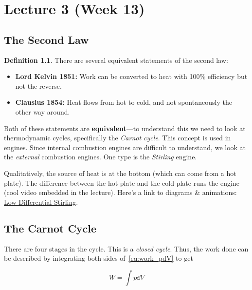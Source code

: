 \documentclass[12pt,chapterprefix=false,dvipsnames]{scrbook}
\theoremstyle{dotless}
\theoremstyle{definition}
\newtheorem{protodefinition}{Definition}[section]
\newenvironment{definition}
{\colorlet{shadecolor}{black!15}\begin{shaded}\begin{protodefinition}}
			{\end{protodefinition}\end{shaded}}
\begin{document}
%

\chapter{Lecture 3 (Week 13)}%
\label{cha:lecture_3}

\section{The Second Law}%
\label{sec:the_second_law}

\begin{definition}
	There are several equivalent statements of the second law:
	\begin{itemize}
		\item \textbf{Lord Kelvin 1851:} Work can be converted to heat with 100\%
		      efficiency but not the reverse.
		\item \textbf{Clausius 1854:} Heat flows from hot to cold, and not
		      spontaneously the other way around.
	\end{itemize}
\end{definition}

Both of these statements are \textbf{equivalent}---to
understand this we need to look at thermodynamic cycles,
specifically the \textit{Carnot cycle}. This concept is used
in engines. Since internal combustion engines are difficult to
understand, we look at the \textit{external} combustion
engines. One type is the \textit{Stirling} engine.

Qualitatively, the source of heat is at the bottom (which can
come from a hot plate). The difference between the hot plate and
the cold plate runs the engine (cool video embedded in the
lecture). Here's a link to diagrams \& animations:
\href{http://animatedengines.com/ltdstirling.html}{Low Differential Stirling}.

\section{The Carnot Cycle}%
\label{sec:the_carnot_cycle}

There are four stages in the cycle. This is a
\textit{closed cycle}. Thus, the work done can be described
by integrating both sides of~\ref{eq:work_pdV} to get

\begin{equation}
	\label{eq:work_pdV_integral_form}
	W = \int p\dd{V}
\end{equation}
\end{document}
